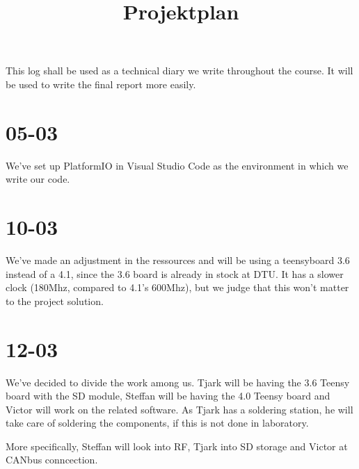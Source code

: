 \documentclass[]{article}
\title{Projektplan}
\begin{document}
This log shall be used as a technical diary we write throughout the course. It will be used to write the final report more easily.

\section{05-03}
We've set up PlatformIO in Visual Studio Code as the environment in which we write our code.

\section{10-03}
We've made an adjustment in the ressources and will be using a teensyboard 3.6 instead of a 4.1, since the 3.6 board is already in stock at DTU. It has a slower clock (180Mhz, compared to 4.1's 600Mhz), but we judge that this won't matter to the project solution.

\section{12-03}
We've decided to divide the work among us.
Tjark will be having the 3.6 Teensy board with the SD module, Steffan will be having the 4.0 Teensy board and Victor will work on the related software.
As Tjark has a soldering station, he will take care of soldering the components, if this is not done in laboratory.

More specifically, Steffan will look into RF, Tjark into SD storage and Victor at CANbus conncection.
\end{document}
